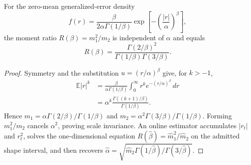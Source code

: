 \begin{theorem}
For the zero-mean generalized-error density
\begin{equation}
 f(r)=\frac{\beta}{2\alpha\Gamma(1/\beta)}
 \exp\!\left[-\left(\frac{|r|}{\alpha}\right)^\beta\right],
\end{equation}
the moment ratio $R(\beta)=m_1^2/m_2$ is independent of $\alpha$ and equals
\begin{equation}
 R(\beta)=\frac{\Gamma(2/\beta)^2}
 {\Gamma(1/\beta)\Gamma(3/\beta)}.
\end{equation}
\end{theorem}
\begin{proof}
Symmetry and the substitution $u=(r/\alpha)^\beta$ give, for $k>-1$,
\begin{align}
 \mathbb E|r|^k
 &=\frac{\beta}{\alpha\Gamma(1/\beta)}
   \int_0^\infty r^k e^{-(r/\alpha)^\beta}\,dr\\
 &=\alpha^k\frac{\Gamma((k+1)/\beta)}{\Gamma(1/\beta)}.
\end{align}
Hence $m_1=\alpha\Gamma(2/\beta)/\Gamma(1/\beta)$ and
$m_2=\alpha^2\Gamma(3/\beta)/\Gamma(1/\beta)$. Forming $m_1^2/m_2$ cancels $\alpha^2$, proving scale invariance. An online estimator accumulates $|r_t|$ and $r_t^2$, solves the one-dimensional equation $R(\widehat\beta)=\widehat m_1^2/\widehat m_2$ on the admitted shape interval, and then recovers
$\widehat\alpha=\sqrt{\widehat m_2\Gamma(1/\widehat\beta)/\Gamma(3/\widehat\beta)}$.
\end{proof}

